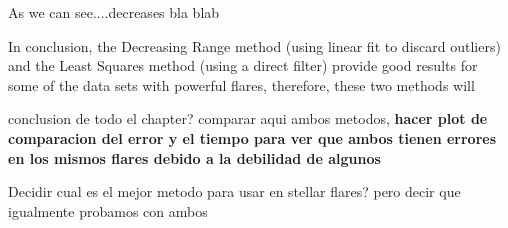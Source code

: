 As we can see....decreases bla blab


In conclusion, the Decreasing Range method (using linear fit to discard outliers) and the Least Squares method (using a direct filter) provide good results for some of the data sets with powerful flares, therefore, these two methods will

conclusion de todo el chapter? comparar aqui ambos metodos, \textbf{hacer plot de comparacion del error y el tiempo para ver que ambos tienen errores en los mismos flares debido a la debilidad de algunos}

Decidir cual es el mejor metodo para usar en stellar flares? pero decir que igualmente probamos con ambos

